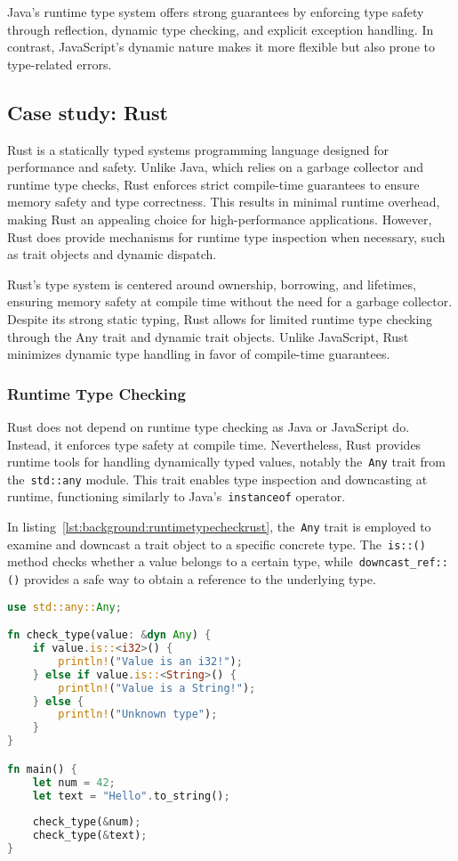 Java’s runtime type system offers strong guarantees by enforcing type safety through reflection, dynamic type checking, and explicit exception handling. In contrast, JavaScript’s dynamic nature makes it more flexible but also prone to type-related errors.

\subsection{Case study: Rust}

Rust is a statically typed systems programming language designed for performance and safety. Unlike Java, which relies on a garbage collector and runtime type checks, Rust enforces strict compile-time guarantees to ensure memory safety and type correctness. This results in minimal runtime overhead, making Rust an appealing choice for high-performance applications. However, Rust does provide mechanisms for runtime type inspection when necessary, such as trait objects and dynamic dispatch.

Rust’s type system is centered around ownership, borrowing, and lifetimes, ensuring memory safety at compile time without the need for a garbage collector. Despite its strong static typing, Rust allows for limited runtime type checking through the Any trait and dynamic trait objects. Unlike JavaScript, Rust minimizes dynamic type handling in favor of compile-time guarantees.

\subsubsection{Runtime Type Checking}

Rust does not depend on runtime type checking as Java or JavaScript do. Instead, it enforces type safety at compile time. Nevertheless, Rust provides runtime tools for handling dynamically typed values, notably the~\lstinline|Any| trait from the~\lstinline|std::any| module. This trait enables type inspection and downcasting at runtime, functioning similarly to Java's~\lstinline|instanceof| operator.

In listing~\ref{lst:background:runtimetypecheckrust}, the~\lstinline|Any| trait is employed to examine and downcast a trait object to a specific concrete type. The~\lstinline|is::()| method checks whether a value belongs to a certain type, while~\lstinline|downcast_ref::()| provides a safe way to obtain a reference to the underlying type.


\begin{lstlisting}[language=Rust,caption=Runtime type checking in Rust,label=lst:background:runtimetypecheckrust]
use std::any::Any;

fn check_type(value: &dyn Any) {
	if value.is::<i32>() {
		println!("Value is an i32!");
	} else if value.is::<String>() {
		println!("Value is a String!");
	} else {
		println!("Unknown type");
	}
}

fn main() {
	let num = 42;
	let text = "Hello".to_string();
	
	check_type(&num);
	check_type(&text);
}
\end{lstlisting}

